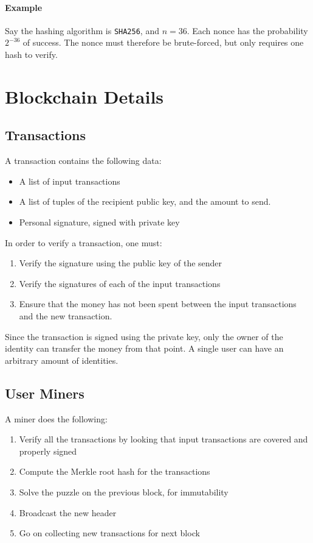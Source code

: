 \documentclass[twocolumn]{article}
\begin{document}
\paragraph{Example} Say the hashing algorithm is \texttt{SHA256}, and $n = 36$. Each nonce has the probability $2^{-36}$ of success. The nonce must therefore be brute-forced, but only requires one hash to verify.

\section{Blockchain Details}
\subsection{Transactions}
A transaction contains the following data:
\begin{itemize}
 \item A list of input transactions
 \item A list of tuples of the recipient public key, and the amount to send.
 \item Personal signature, signed with private key
\end{itemize}

\noindent
In order to verify a transaction, one must:

\begin{enumerate}
 \item Verify the signature using the public key of the sender
 \item Verify the signatures of each of the input transactions
 \item Ensure that the money has not been spent between the input transactions and the new transaction.
\end{enumerate}

Since the transaction is signed using the private key, only the owner of the identity can transfer the money from that point.
A single user can have an arbitrary amount of identities.

\subsection{User Miners}
A miner does the following:
\begin{enumerate}
 \item Verify all the transactions by looking that input transactions are covered and properly signed
 \item Compute the Merkle root hash for the transactions
 \item Solve the puzzle on the previous block, for immutability
 \item Broadcast the new header
 \item Go on collecting new transactions for next block
\end{enumerate}
\end{document}
